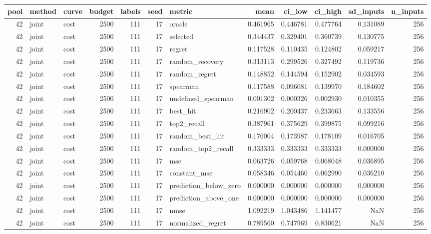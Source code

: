 \begin{tabular}{rllrrrlrrrrr}
\toprule
pool & method & curve & budget & labels & seed & metric & mean & ci_low & ci_high & sd_inputs & n_inputs \\
\midrule
42 & joint & cost & 2500 & 111 & 17 & oracle & 0.461965 & 0.446781 & 0.477764 & 0.131089 & 256 \\
42 & joint & cost & 2500 & 111 & 17 & selected & 0.344437 & 0.329401 & 0.360739 & 0.130775 & 256 \\
42 & joint & cost & 2500 & 111 & 17 & regret & 0.117528 & 0.110435 & 0.124802 & 0.059217 & 256 \\
42 & joint & cost & 2500 & 111 & 17 & random_recovery & 0.313113 & 0.299526 & 0.327492 & 0.119736 & 256 \\
42 & joint & cost & 2500 & 111 & 17 & random_regret & 0.148852 & 0.144594 & 0.152902 & 0.034593 & 256 \\
42 & joint & cost & 2500 & 111 & 17 & spearman & 0.117588 & 0.096081 & 0.139970 & 0.184602 & 256 \\
42 & joint & cost & 2500 & 111 & 17 & undefined_spearman & 0.001302 & 0.000326 & 0.002930 & 0.010355 & 256 \\
42 & joint & cost & 2500 & 111 & 17 & best_hit & 0.216902 & 0.200437 & 0.233663 & 0.133556 & 256 \\
42 & joint & cost & 2500 & 111 & 17 & top2_recall & 0.387961 & 0.375629 & 0.399875 & 0.099216 & 256 \\
42 & joint & cost & 2500 & 111 & 17 & random_best_hit & 0.176004 & 0.173987 & 0.178109 & 0.016705 & 256 \\
42 & joint & cost & 2500 & 111 & 17 & random_top2_recall & 0.333333 & 0.333333 & 0.333333 & 0.000000 & 256 \\
42 & joint & cost & 2500 & 111 & 17 & mse & 0.063726 & 0.059768 & 0.068048 & 0.036895 & 256 \\
42 & joint & cost & 2500 & 111 & 17 & constant_mse & 0.058346 & 0.054460 & 0.062990 & 0.036210 & 256 \\
42 & joint & cost & 2500 & 111 & 17 & prediction_below_zero & 0.000000 & 0.000000 & 0.000000 & 0.000000 & 256 \\
42 & joint & cost & 2500 & 111 & 17 & prediction_above_one & 0.000000 & 0.000000 & 0.000000 & 0.000000 & 256 \\
42 & joint & cost & 2500 & 111 & 17 & nmse & 1.092219 & 1.043486 & 1.141477 & NaN & 256 \\
42 & joint & cost & 2500 & 111 & 17 & normalized_regret & 0.789560 & 0.747969 & 0.830621 & NaN & 256 \\

\end{tabular}
